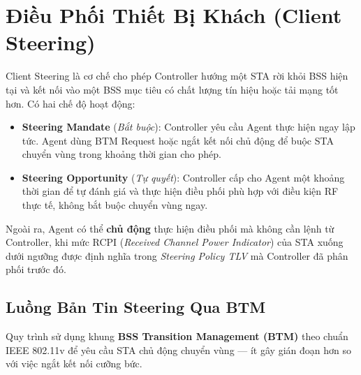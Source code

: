 \section{Điều Phối Thiết Bị Khách (Client Steering)}

Client Steering là cơ chế cho phép Controller hướng một STA rời khỏi BSS hiện tại và
kết nối vào một BSS mục tiêu có chất lượng tín hiệu hoặc tải mạng tốt hơn. Có hai
chế độ hoạt động:

\begin{itemize}
	\item \textbf{Steering Mandate} (\textit{Bắt buộc}): Controller yêu cầu Agent thực
	hiện ngay lập tức. Agent dùng BTM Request hoặc ngắt kết nối chủ động để buộc
	STA chuyển vùng trong khoảng thời gian cho phép.
	\item \textbf{Steering Opportunity} (\textit{Tự quyết}): Controller cấp cho Agent
	một khoảng thời gian để tự đánh giá và thực hiện điều phối phù hợp với điều
	kiện RF thực tế, không bắt buộc chuyển vùng ngay.
\end{itemize}

Ngoài ra, Agent có thể \textbf{chủ động} thực hiện điều phối mà không cần lệnh từ
Controller, khi mức RCPI (\textit{Received Channel Power Indicator}) của STA xuống
dưới ngưỡng được định nghĩa trong \textit{Steering Policy TLV} mà Controller đã
phân phối trước đó.


\subsection{Luồng Bản Tin Steering Qua BTM}

Quy trình sử dụng khung \textbf{BSS Transition Management (BTM)} theo chuẩn IEEE
802.11v để yêu cầu STA chủ động chuyển vùng --- ít gây gián đoạn hơn so với việc
ngắt kết nối cưỡng bức.

